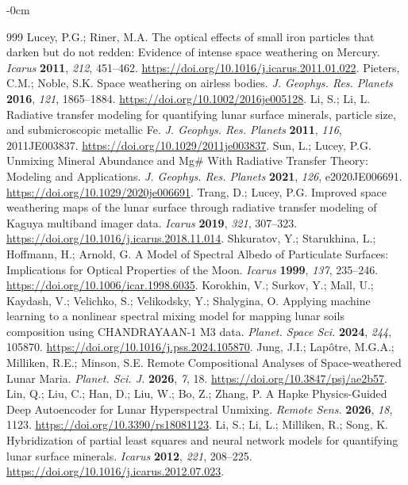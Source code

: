 \documentclass[remotesensing,article,submit,pdftex,moreauthors]{Definitions/mdpi}
\begin{document}
\begin{adjustwidth}{-\extralength}{0cm}
\begin{thebibliography}{999}
Lucey, P.G.; Riner, M.A. The optical effects of small iron particles that darken but do not redden: Evidence of intense space weathering on Mercury. \emph{Icarus} {\bf 2011}, \emph{212}, 451--462. \url{https://doi.org/10.1016/j.icarus.2011.01.022}.
Pieters, C.M.; Noble, S.K. Space weathering on airless bodies. \emph{J. Geophys. Res. Planets} {\bf 2016}, \emph{121}, 1865--1884. \url{https://doi.org/10.1002/2016je005128}.
Li, S.; Li, L. Radiative transfer modeling for quantifying lunar surface minerals, particle size, and submicroscopic metallic Fe. \emph{J. Geophys. Res. Planets} {\bf 2011}, \emph{116}, 2011JE003837. \url{https://doi.org/10.1029/2011je003837}.
Sun, L.; Lucey, P.G. Unmixing Mineral Abundance and Mg\# With Radiative Transfer Theory: Modeling and Applications. \emph{J. Geophys. Res. Planets} {\bf 2021}, \emph{126}, e2020JE006691. \url{https://doi.org/10.1029/2020je006691}.
Trang, D.; Lucey, P.G. Improved space weathering maps of the lunar surface through radiative transfer modeling of Kaguya multiband imager data. \emph{Icarus} {\bf 2019}, \emph{321}, 307--323. \url{https://doi.org/10.1016/j.icarus.2018.11.014}.
Shkuratov, Y.; Starukhina, L.; Hoffmann, H.; Arnold, G. A Model of Spectral Albedo of Particulate Surfaces: Implications for Optical Properties of the Moon. \emph{Icarus} {\bf 1999}, \emph{137}, 235--246. \url{https://doi.org/10.1006/icar.1998.6035}.
Korokhin, V.; Surkov, Y.; Mall, U.; Kaydash, V.; Velichko, S.; Velikodsky, Y.; Shalygina, O. Applying machine learning to a nonlinear spectral mixing model for mapping lunar soils composition using CHANDRAYAAN-1 M3 data. \emph{Planet. Space Sci.} {\bf 2024}, \emph{244}, 105870. \url{https://doi.org/10.1016/j.pss.2024.105870}.
Jung, J.I.; Lapôtre, M.G.A.; Milliken, R.E.; Minson, S.E. Remote Compositional Analyses of Space-weathered Lunar Maria. \emph{Planet. Sci. J.} {\bf 2026}, \emph{7}, 18. \url{https://doi.org/10.3847/psj/ae2b57}.
Lin, Q.; Liu, C.; Han, D.; Liu, W.; Bo, Z.; Zhang, P. A Hapke Physics-Guided Deep Autoencoder for Lunar Hyperspectral Unmixing. \emph{Remote Sens.} {\bf 2026}, \emph{18}, 1123. \url{https://doi.org/10.3390/rs18081123}.
Li, S.; Li, L.; Milliken, R.; Song, K. Hybridization of partial least squares and neural network models for quantifying lunar surface minerals. \emph{Icarus} {\bf 2012}, \emph{221}, 208--225. \url{https://doi.org/10.1016/j.icarus.2012.07.023}.

\end{thebibliography}
\end{adjustwidth}
\end{document}
